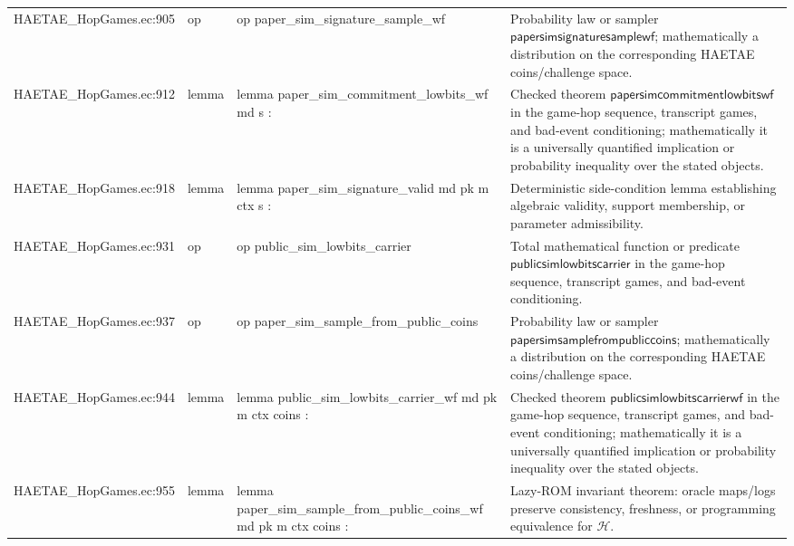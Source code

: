 \documentclass[10pt]{article}
\begin{document}
\begin{longtable}{L{0.11\textwidth}L{0.055\textwidth}L{0.385\textwidth}L{0.41\textwidth}}
HAETAE\_\allowbreak{}HopGames.\allowbreak{}ec:\allowbreak{}905 & op & {\ttfamily\scriptsize op paper\_\allowbreak{}sim\_\allowbreak{}signature\_\allowbreak{}sample\_\allowbreak{}wf} & Probability law or sampler $\mathsf{papersimsignaturesamplewf}$; mathematically a distribution on the corresponding HAETAE coins/challenge space. \\
HAETAE\_\allowbreak{}HopGames.\allowbreak{}ec:\allowbreak{}912 & lemma & {\ttfamily\scriptsize lemma paper\_\allowbreak{}sim\_\allowbreak{}commitment\_\allowbreak{}lowbits\_\allowbreak{}wf md s :} & Checked theorem $\mathsf{papersimcommitmentlowbitswf}$ in the game-hop sequence, transcript games, and bad-event conditioning; mathematically it is a universally quantified implication or probability inequality over the stated objects. \\
HAETAE\_\allowbreak{}HopGames.\allowbreak{}ec:\allowbreak{}918 & lemma & {\ttfamily\scriptsize lemma paper\_\allowbreak{}sim\_\allowbreak{}signature\_\allowbreak{}valid md pk m ctx s :} & Deterministic side-condition lemma establishing algebraic validity, support membership, or parameter admissibility. \\
HAETAE\_\allowbreak{}HopGames.\allowbreak{}ec:\allowbreak{}931 & op & {\ttfamily\scriptsize op public\_\allowbreak{}sim\_\allowbreak{}lowbits\_\allowbreak{}carrier} & Total mathematical function or predicate $\mathsf{publicsimlowbitscarrier}$ in the game-hop sequence, transcript games, and bad-event conditioning. \\
HAETAE\_\allowbreak{}HopGames.\allowbreak{}ec:\allowbreak{}937 & op & {\ttfamily\scriptsize op paper\_\allowbreak{}sim\_\allowbreak{}sample\_\allowbreak{}from\_\allowbreak{}public\_\allowbreak{}coins} & Probability law or sampler $\mathsf{papersimsamplefrompubliccoins}$; mathematically a distribution on the corresponding HAETAE coins/challenge space. \\
HAETAE\_\allowbreak{}HopGames.\allowbreak{}ec:\allowbreak{}944 & lemma & {\ttfamily\scriptsize lemma public\_\allowbreak{}sim\_\allowbreak{}lowbits\_\allowbreak{}carrier\_\allowbreak{}wf md pk m ctx coins :} & Checked theorem $\mathsf{publicsimlowbitscarrierwf}$ in the game-hop sequence, transcript games, and bad-event conditioning; mathematically it is a universally quantified implication or probability inequality over the stated objects. \\
HAETAE\_\allowbreak{}HopGames.\allowbreak{}ec:\allowbreak{}955 & lemma & {\ttfamily\scriptsize lemma paper\_\allowbreak{}sim\_\allowbreak{}sample\_\allowbreak{}from\_\allowbreak{}public\_\allowbreak{}coins\_\allowbreak{}wf md pk m ctx coins :} & Lazy-ROM invariant theorem: oracle maps/logs preserve consistency, freshness, or programming equivalence for $\mathcal H$. \\

\end{longtable}
\end{document}
